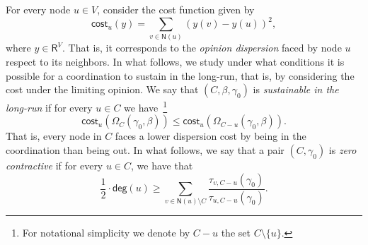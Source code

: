 \documentclass[letterpaper,11pt]{article}
\newcommand{\RR}{\mathsf{R}}
\newcommand{\ZZ}{\mathbb{Z}}
\newcommand{\EE}{\mathsf{E}}
\newcommand{\nsf}{\mathsf{N}}
\newcommand{\cost}{\mathsf{cost}}
\newcommand{\degsf}{\mathsf{deg}}
\newcommand{\vvcom}[1]{\todo[color=red!25!white]{Victor: #1}}
\begin{document}
For every node $u\in V$, consider the cost function given by
\begin{equation*}
\cost_u(y)=\sum_{v\in \nsf(u)}(y(v)-y(u))^2,
\end{equation*} 
where $y\in \RR^V$.
That is, it corresponds to the {\it opinion dispersion} faced by node $u$ respect to its neighbors. 
In what follows, we study under what conditions it is possible for a coordination to sustain in the long-run, that is, by considering the cost under the limiting opinion.
We say that $(C,\beta,\gamma_0)$ is {\it sustainable in the long-run} if for every $u\in C$ we have~\footnote{For notational simplicity we denote by $C-u$ the set $C\setminus \{u\}$.} 
\begin{equation*}
\cost_u(\Omega_C(\gamma_0,\beta))\le \cost_u(\Omega_{C-u}(\gamma_0,\beta)).
\end{equation*}
That is, every node in $C$ faces a lower dispersion cost by being in the coordination than being out.
In what follows, we say that a pair $(C,\gamma_0)$ is {\it zero contractive} if for every $u\in C$, we have that 
\begin{equation*}
\frac{1}{2}\cdot \degsf(u) \ge \sum_{v\in \nsf(u)\setminus C}\frac{\tau_{v,C-u}(\gamma_0)}{\tau_{u,C-u}(\gamma_0)}.
\end{equation*}
\end{document}
